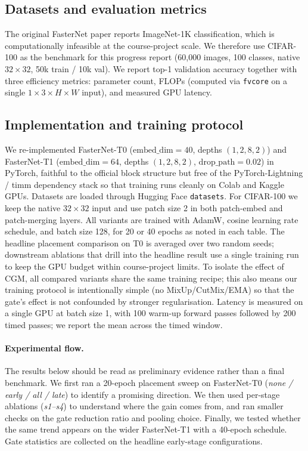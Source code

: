 \documentclass{article}
\begin{document}
\subsection{Datasets and evaluation metrics}

The original FasterNet paper reports ImageNet-1K classification, which is computationally infeasible at the course-project scale. We therefore use CIFAR-100 \citep{krizhevsky2009cifar} as the benchmark for this progress report (60{,}000 images, 100 classes, native $32{\times}32$, 50k train / 10k val). We report top-1 validation accuracy together with three efficiency metrics: parameter count, FLOPs (computed via \texttt{fvcore} on a single $1{\times}3{\times}H{\times}W$ input), and measured GPU latency.

\subsection{Implementation and training protocol}

We re-implemented FasterNet-T0 ($\mathrm{embed\_dim}{=}40$, depths $(1,2,8,2)$) and FasterNet-T1 ($\mathrm{embed\_dim}{=}64$, depths $(1,2,8,2)$, $\mathrm{drop\_path}{=}0.02$) in PyTorch, faithful to the official block structure but free of the PyTorch-Lightning / timm dependency stack so that training runs cleanly on Colab and Kaggle GPUs. Datasets are loaded through Hugging Face \texttt{datasets}. For CIFAR-100 we keep the native $32{\times}32$ input and use patch size 2 in both patch-embed and patch-merging layers. All variants are trained with AdamW, cosine learning rate schedule, and batch size 128, for 20 or 40 epochs as noted in each table. The headline placement comparison on T0 is averaged over two random seeds; downstream ablations that drill into the headline result use a single training run to keep the GPU budget within course-project limits. To isolate the effect of CGM, all compared variants share the same training recipe; this also means our training protocol is intentionally simple (no MixUp/CutMix/EMA) so that the gate's effect is not confounded by stronger regularisation. Latency is measured on a single GPU at batch size 1, with 100 warm-up forward passes followed by 200 timed passes; we report the mean across the timed window.

\paragraph{Experimental flow.} The results below should be read as preliminary evidence rather than a final benchmark. We first ran a 20-epoch placement sweep on FasterNet-T0 (\emph{none / early / all / late}) to identify a promising direction. We then used per-stage ablations (\emph{s1--s4}) to understand where the gain comes from, and ran smaller checks on the gate reduction ratio and pooling choice. Finally, we tested whether the same trend appears on the wider FasterNet-T1 with a 40-epoch schedule. Gate statistics are collected on the headline early-stage configurations.
\end{document}
